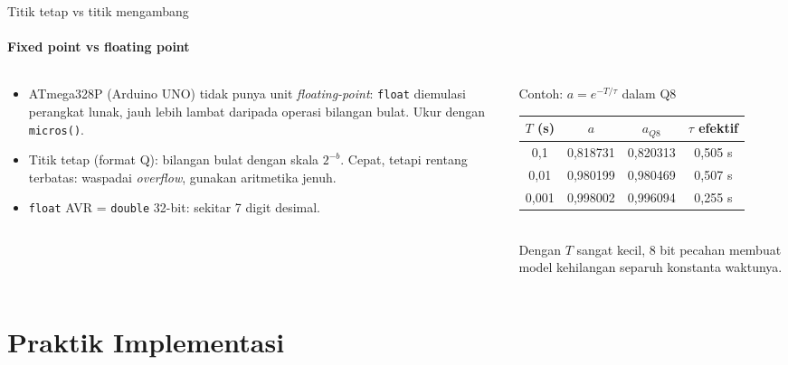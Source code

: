 \documentclass[aspectratio=169,10pt]{beamer}
\begin{document}
\begin{frame}{Titik tetap vs titik mengambang}
	\framesubtitle{Fixed point vs floating point}
	\begin{columns}[T]
		\begin{column}{0.5\textwidth}
			\small
			\begin{itemize}
				\item ATmega328P (Arduino UNO) tidak punya unit \textit{floating-point}: \texttt{float} diemulasi perangkat lunak, jauh lebih lambat daripada operasi bilangan bulat. Ukur dengan \texttt{micros()}.
				\item Titik tetap (format Q): bilangan bulat dengan skala $2^{-b}$. Cepat, tetapi rentang terbatas: waspadai \textit{overflow}, gunakan aritmetika jenuh.
				\item \texttt{float} AVR = \texttt{double} 32-bit: sekitar 7 digit desimal.
			\end{itemize}
		\end{column}
		\begin{column}{0.46\textwidth}
			\begin{exampleblock}{Contoh: $a = e^{-T/\tau}$ dalam Q8}
				\scriptsize
				\renewcommand{\arraystretch}{1.2}
				\begin{tabular}{@{}c c c c@{}}
					\toprule
					$T$ (s) & $a$ & $a_{Q8}$ & $\tau$ efektif \\
					\midrule
					0,1 & 0,818731 & 0,820313 & 0,505 s \\
					0,01 & 0,980199 & 0,980469 & 0,507 s \\
					0,001 & 0,998002 & 0,996094 & 0,255 s \\
					\bottomrule
				\end{tabular}\\[3pt]
				\small Dengan $T$ sangat kecil, 8 bit pecahan membuat model kehilangan separuh konstanta waktunya.
			\end{exampleblock}
		\end{column}
	\end{columns}
\end{frame}

\section{Praktik Implementasi\texorpdfstring{\\[4pt]{\Large{}}}{ / Implementation Practice}}
\end{document}
